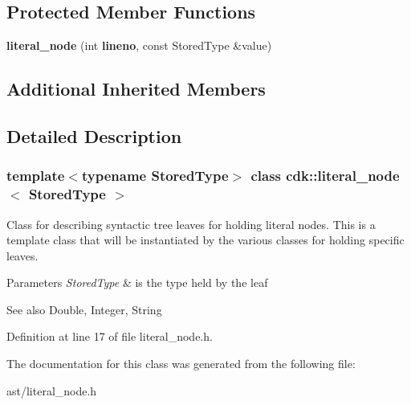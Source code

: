 \subsection*{Protected Member Functions}
\begin{DoxyCompactItemize}
\item 
\mbox{\label{classcdk_1_1literal__node_aa75409de8595d4073ca995f988210ae8}} 
{\bfseries literal\+\_\+node} (int \textbf{ lineno}, const Stored\+Type \&value)
\end{DoxyCompactItemize}
\subsection*{Additional Inherited Members}


\subsection{Detailed Description}
\subsubsection*{template$<$typename Stored\+Type$>$\newline
class cdk\+::literal\+\_\+node$<$ Stored\+Type $>$}

Class for describing syntactic tree leaves for holding literal nodes. This is a template class that will be instantiated by the various classes for holding specific leaves.


\begin{DoxyParams}{Parameters}
{\em Stored\+Type} & is the type held by the leaf \\
\hline
\end{DoxyParams}
\begin{DoxySeeAlso}{See also}
Double, Integer, String 
\end{DoxySeeAlso}


Definition at line 17 of file literal\+\_\+node.\+h.



The documentation for this class was generated from the following file\+:\begin{DoxyCompactItemize}
\item 
ast/literal\+\_\+node.\+h\end{DoxyCompactItemize}

